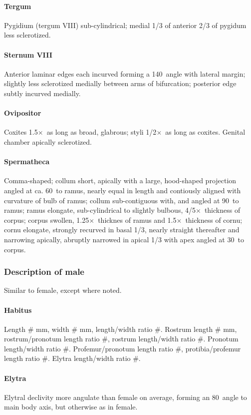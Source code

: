 \documentclass[fleqn,10pt,lineno]{wlpeerj} %
\newcommand{\td}{\textdegree~}
\newcommand{\x}{$\times$~}
\begin{document}
			\paragraph{Tergum}
				Pygidium (tergum VIII) sub-cylindrical; medial 1/3 of anterior 2/3 of pygidum less sclerotized.
			\paragraph{Sternum VIII}
				Anterior laminar edges each incurved forming a 140\td angle with lateral margin; slightly less sclerotized medially between arms of bifurcation; posterior edge subtly incurved medially.
			\paragraph{Ovipositor}
				Coxites 1.5\x as long as broad, glabrous; styli 1/2\x as long as coxites. Genital chamber apically sclerotized.
			\paragraph{Spermatheca}
				Comma-shaped; collum short, apically with a large, hood-shaped projection angled at ca. 60\td to ramus, nearly equal in length and contiously aligned with curvature of bulb of ramus; collum sub-contiguous with, and angled at 90\td to ramus; ramus elongate, sub-cylindrical to slightly bulbous, 4/5\x thickness of corpus; corpus swollen, 1.25\x thicknes of ramus and 1.5\x thickness of cornu; cornu elongate, strongly recurved in basal 1/3, nearly straight thereafter and narrowing apically, abruptly narrowed in apical 1/3 with apex angled at 30\td to corpus.
		\subsubsection*{Description of male}
			Similar to female, except where noted.
			\paragraph{Habitus}
				Length \# mm, width \# mm, length/width ratio \#. Rostrum length \# mm, rostrum/pronotum length ratio \#, rostrum length/width ratio \#. Pronotum length/width ratio \#. Profemur/pronotum length ratio \#, protibia/profemur length ratio \#. Elytra length/width ratio \#.
			\paragraph{Elytra}
				Elytral declivity more angulate than female on average, forming an 80\td angle to main body axis, but otherwise as in female.
\end{document}
